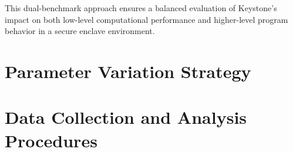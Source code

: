 This dual-benchmark approach ensures a balanced evaluation of Keystone’s impact on both low-level computational performance and higher-level program behavior in a secure enclave environment.

\section{Parameter Variation Strategy}


\section{Data Collection and Analysis Procedures}
